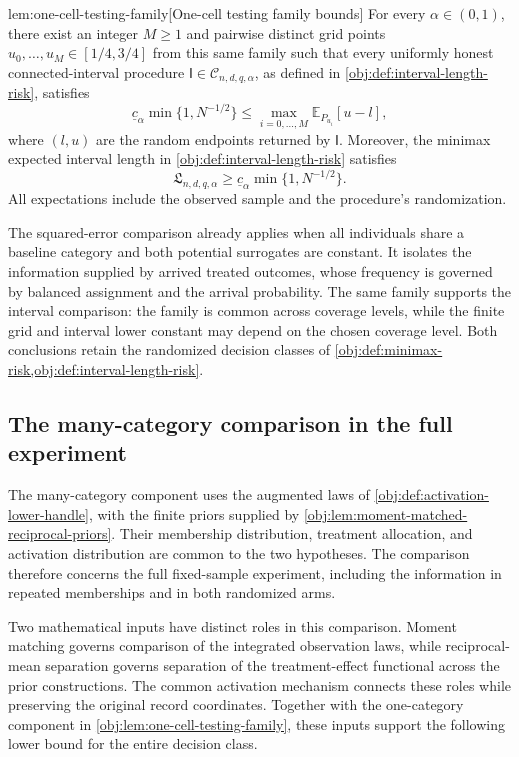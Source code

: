 \begin{lemmav}{lem:one-cell-testing-family}[One-cell testing family bounds]
For every \(\alpha\in(0,1)\), there exist an integer \(M\ge1\) and pairwise distinct grid points \(u_0,\ldots,u_M\in[1/4,3/4]\) from this same family such that every uniformly honest connected-interval procedure \(\mathsf I\in\mathcal C_{n,d,q,\alpha}\), as defined in \cref{obj:def:interval-length-risk}, satisfies
\[
\underline c_\alpha\min\{1,N^{-1/2}\}
\le
\max_{i=0,\ldots,M}\mathbb E_{P_{u_i}}[u-l],
\]
where \((l,u)\) are the random endpoints returned by \(\mathsf I\). Moreover, the minimax expected interval length in \cref{obj:def:interval-length-risk} satisfies
\[
\mathfrak L_{n,d,q,\alpha}\ge
\underline c_\alpha\min\{1,N^{-1/2}\}.
\]
All expectations include the observed sample and the procedure's randomization.
\end{lemmav}

The squared-error comparison already applies when all individuals share a baseline category and both potential surrogates are constant. It isolates the information supplied by arrived treated outcomes, whose frequency is governed by balanced assignment and the arrival probability. The same family supports the interval comparison: the family is common across coverage levels, while the finite grid and interval lower constant may depend on the chosen coverage level. Both conclusions retain the randomized decision classes of \cref{obj:def:minimax-risk,obj:def:interval-length-risk}.

\subsection{The many-category comparison in the full experiment}

The many-category component uses the augmented laws of \cref{obj:def:activation-lower-handle}, with the finite priors supplied by \cref{obj:lem:moment-matched-reciprocal-priors}. Their membership distribution, treatment allocation, and activation distribution are common to the two hypotheses. The comparison therefore concerns the full fixed-sample experiment, including the information in repeated memberships and in both randomized arms.

Two mathematical inputs have distinct roles in this comparison. Moment matching governs comparison of the integrated observation laws, while reciprocal-mean separation governs separation of the treatment-effect functional across the prior constructions. The common activation mechanism connects these roles while preserving the original record coordinates. Together with the one-category component in \cref{obj:lem:one-cell-testing-family}, these inputs support the following lower bound for the entire decision class.

